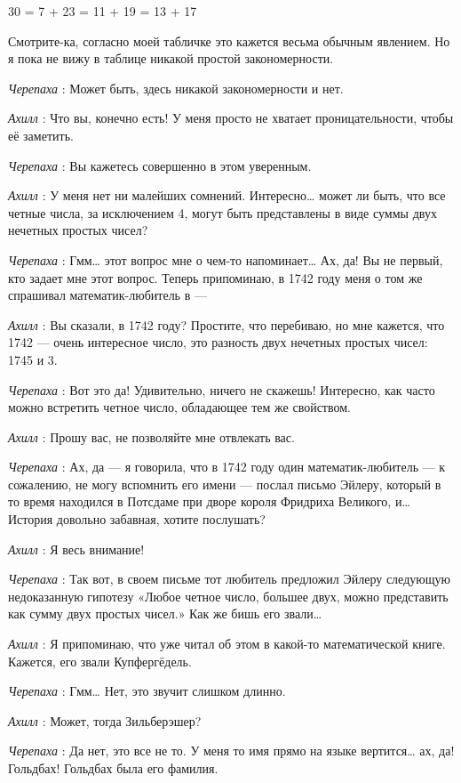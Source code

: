 \documentclass[../main.tex]{subfiles}
\begin{document}
\begin{dialogue}
30 = 7 + 23 = 11 + 19 = 13 + 17

Смотрите-ка, согласно моей табличке это кажется весьма обычным явлением. Но я пока не вижу в таблице никакой простой закономерности.

\emph{Черепаха} : Может быть, здесь никакой закономерности и нет.

\emph{Ахилл} : Что вы, конечно есть! У меня просто не хватает проницательности, чтобы её заметить.

\emph{Черепаха} : Вы кажетесь совершенно в этом уверенным.

\emph{Ахилл} : У меня нет ни малейших сомнений. Интересно\ldots{} может ли быть, что все четные числа, за исключением 4, могут быть представлены в виде суммы двух нечетных простых чисел?

\emph{Черепаха} : Гмм\ldots{} этот вопрос мне о чем-то напоминает\ldots{} Ах, да! Вы не первый, кто задает мне этот вопрос. Теперь припоминаю, в 1742 году меня о том же спрашивал математик-любитель в ---

\emph{Ахилл} : Вы сказали, в 1742 году? Простите, что перебиваю, но мне кажется, что 1742 --- очень интересное число, это разность двух нечетных простых чисел: 1745 и 3.

\emph{Черепаха} : Вот это да! Удивительно, ничего не скажешь! Интересно, как часто можно встретить четное число, обладающее тем же свойством.

\emph{Ахилл} : Прошу вас, не позволяйте мне отвлекать вас.

\emph{Черепаха} : Ах, да --- я говорила, что в 1742 году один математик-любитель --- к сожалению, не могу вспомнить его имени --- послал письмо Эйлеру, который в то время находился в Потсдаме при дворе короля Фридриха Великого, и\ldots{} История довольно забавная, хотите послушать?

\emph{Ахилл} : Я весь внимание!

\emph{Черепаха} : Так вот, в своем письме тот любитель предложил Эйлеру следующую недоказанную гипотезу «Любое четное число, большее двух, можно представить как сумму двух простых чисел.» Как же бишь его звали\ldots{}

\emph{Ахилл} : Я припоминаю, что уже читал об этом в какой-то математической книге. Кажется, его звали Купфергёдель.

\emph{Черепаха} : Гмм\ldots{} Нет, это звучит слишком длинно.

\emph{Ахилл} : Может, тогда Зильберэшер?

\emph{Черепаха} : Да нет, это все не то. У меня то имя прямо на языке вертится\ldots{} ах, да! Гольдбах! Гольдбах была его фамилия.


\end{dialogue}
\end{document}

